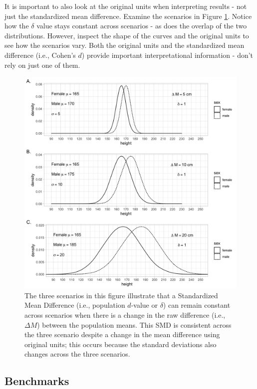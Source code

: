\documentclass[
]{krantz}
\begin{document}
It is important to also look at the original units when interpreting results - not just the standardized mean difference. Examine the scenarios in Figure \ref{fig:dex3}. Notice how the \(\delta\) value stays constant across scenarios - as does the overlap of the two distributions. However, inspect the shape of the curves and the original units to see how the scenarios vary. Both the original units and the standardized mean difference (i.e., Cohen's \(d\)) provide important interpretational information - don't rely on just one of them.

\begin{figure}
\includegraphics[width=1\linewidth]{ch_populations/images/dvalue_ex3} \caption{The three scenarios in this figure illustrate that a Standardized Mean Difference (i.e., population $d$-value or $\delta$) can remain constant across scenarios when there is a change in the raw difference (i.e., $\Delta M$) between the population means. This SMD is consistent across the three scenario despite a change in the mean difference using original units; this occurs because the standard deviations also changes across the three scenarios.}\label{fig:dex3}
\end{figure}

\hypertarget{benchmarks}{%
\subsection{Benchmarks}\label{benchmarks}}
\end{document}
